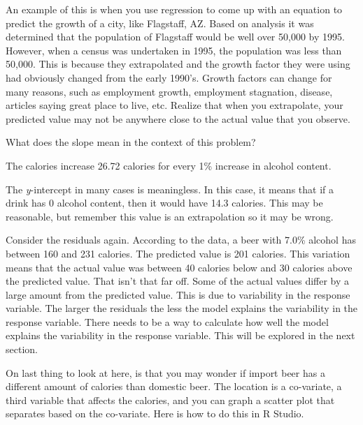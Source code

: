 \documentclass[
]{book}
\newenvironment{Shaded}{\begin{snugshade}}{\end{snugshade}}
\newcommand{\DataTypeTok}[1]{\textcolor[rgb]{0.13,0.29,0.53}{#1}}
\newcommand{\KeywordTok}[1]{\textcolor[rgb]{0.13,0.29,0.53}{\textbf{#1}}}
\newcommand{\NormalTok}[1]{#1}
\newcommand{\OperatorTok}[1]{\textcolor[rgb]{0.81,0.36,0.00}{\textbf{#1}}}
\newcommand{\StringTok}[1]{\textcolor[rgb]{0.31,0.60,0.02}{#1}}
\begin{document}
An example of this is when you use regression to come up with an equation to predict the growth of a city, like Flagstaff, AZ. Based on analysis it was determined that the population of Flagstaff would be well over 50,000 by 1995. However, when a census was undertaken in 1995, the population was less than 50,000. This is because they extrapolated and the growth factor they were using had obviously changed from the early 1990's. Growth factors can change for many reasons, such as employment growth, employment stagnation, disease, articles saying great place to live, etc. Realize that when you extrapolate, your predicted value may not be anywhere close to the actual value that you observe.

What does the slope mean in the context of this problem?

The calories increase 26.72 calories for every 1\% increase in alcohol content.

The \emph{y}-intercept in many cases is meaningless. In this case, it means that if a drink has 0 alcohol content, then it would have 14.3 calories. This may be reasonable, but remember this value is an extrapolation so it may be wrong.

Consider the residuals again. According to the data, a beer with 7.0\% alcohol has between 160 and 231 calories. The predicted value is 201 calories. This variation means that the actual value was between 40 calories below and 30 calories above the predicted value. That isn't that far off. Some of the actual values differ by a large amount from the predicted value. This is due to variability in the response variable. The larger the residuals the less the model explains the variability in the response variable. There needs to be a way to calculate how well the model explains the variability in the response variable. This will be explored in the next section.

On last thing to look at here, is that you may wonder if import beer has a different amount of calories than domestic beer. The location is a co-variate, a third variable that affects the calories, and you can graph a scatter plot that separates based on the co-variate. Here is how to do this in R Studio.



\begin{Shaded}
\end{Shaded}
\end{document}
